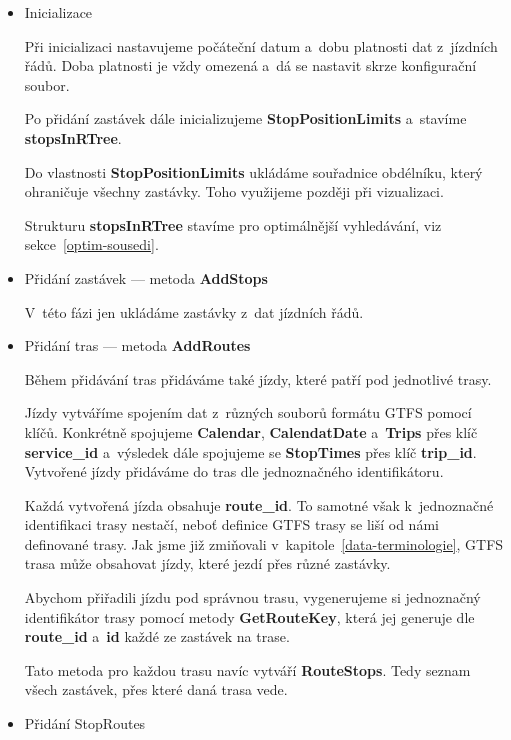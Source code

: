\begin{itemize}
    \item Inicializace
    
    Při inicializaci nastavujeme počáteční datum a~dobu platnosti dat z~jízdních řádů. Doba platnosti je vždy omezená a~dá se nastavit skrze konfigurační soubor.
    
    Po přidání zastávek dále inicializujeme \textbf{StopPositionLimits} a~stavíme \textbf{stopsInRTree}.
    
    Do vlastnosti \textbf{StopPositionLimits} ukládáme souřadnice obdélníku, který ohraničuje všechny zastávky. Toho využijeme později při vizualizaci.
    
    Strukturu \textbf{stopsInRTree} stavíme pro optimálnější vyhledávání, viz sekce~\ref{optim-sousedi}.
    
    \item Přidání zastávek --- metoda \textbf{AddStops}
    
    V~této fázi jen ukládáme zastávky z~dat jízdních řádů.
    
    \item Přidání tras --- metoda \textbf{AddRoutes}
    
    Během přidávání tras přidáváme také jízdy, které patří pod jednotlivé trasy.
    
    Jízdy vytváříme spojením dat z~různých souborů formátu GTFS pomocí klíčů. Konkrétně spojujeme \textbf{Calendar}, \textbf{CalendatDate} a~\textbf{Trips} přes klíč \textbf{service\_id} a~výsledek dále spojujeme se \textbf{StopTimes} přes klíč \textbf{trip\_id}. Vytvořené jízdy přidáváme do tras dle jednoznačného identifikátoru.
    
    Každá vytvořená jízda obsahuje \textbf{route\_id}. To samotné však k~jednoznačné identifikaci trasy nestačí, neboť definice GTFS trasy se liší od námi definované trasy. Jak jsme již zmiňovali v~kapitole~\ref{data-terminologie}, GTFS trasa může obsahovat jízdy, které jezdí přes různé zastávky.
    
    Abychom přiřadili jízdu pod správnou trasu, vygenerujeme si jednoznačný identifikátor trasy pomocí metody \textbf{GetRouteKey}, která jej generuje dle \textbf{route\_id} a~\textbf{id} každé ze zastávek na trase.
    
    Tato metoda pro každou trasu navíc vytváří \textbf{RouteStops}. Tedy seznam všech zastávek, přes které daná trasa vede.
    
    \item Přidání StopRoutes
    

\end{itemize}
